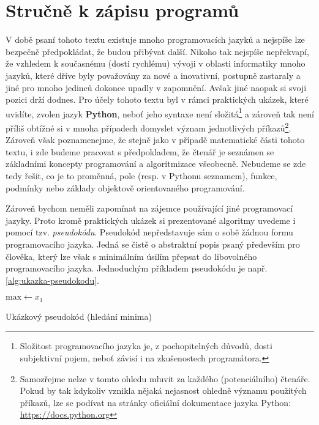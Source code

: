 \section{Stručně k zápisu programů}\label{sec:zapis-programu}

V době psaní tohoto textu existuje mnoho programovacích jazyků a nejspíše lze bezpečně předpokládat, že budou přibývat další. Nikoho tak nejspíše nepřekvapí, že vzhledem k současnému (dosti rychlému) vývoji v oblasti informatiky mnoho jazyků, které dříve byly považovány za nové a inovativní, postupně zastaraly a jiné pro mnoho jedinců dokonce upadly v zapomnění. Avšak jiné naopak si svoji pozici drží dodnes. Pro účely tohoto textu byl v rámci praktických ukázek, které uvidíte, zvolen jazyk \textbf{Python}, neboť jeho syntaxe není složitá\footnote{Složitost programovacího jazyka je, z pochopitelných důvodů, dosti subjektivní pojem, neboť závisí i na zkušenostech programátora.} a zároveň tak není příliš obtížné si v mnoha případech domyslet význam jednotlivých příkazů\footnote{Samozřejme nelze v tomto ohledu mluvit za každého (potenciálního) čtenáře. Pokud by tak kdykoliv vznikla nějaká nejasnost ohledně významu použitých příkazů, lze se podívat na stránky oficiální dokumentace jazyka Python: \url{https://docs.python.org}}. Zároveň však poznamenejme, že stejně jako v případě matematické části tohoto textu, i zde budeme pracovat s předpokladem, že čtenář je seznámen se základními koncepty programování a algoritmizace všeobecně. Nebudeme se zde tedy řešit, co je to proměnná, pole (resp. v Pythonu seznamem), funkce, podmínky nebo základy objektově orientovaného programování.

Zároveň bychom neměli zapomínat na zájemce používající jiné programovací jazyky. Proto kromě praktických ukázek si prezentované algoritmy uvedeme i pomocí tzv. \emph{pseudokódu}. Pseudokód nepředstavuje sám o sobě žádnou formu programovacího jazyka. Jedná se čistě o abstraktní popis psaný především pro člověka, který lze však s minimálním úsilím přepsat do libovolného programovacího jazyka. Jednoduchým příkladem pseudokódu je např. \ref{alg:ukazka-pseudokodu}.
\begin{algorithm}
    $\text{max}\gets x_1$\;
    \caption{Ukázkový pseudokód (hledání minima)}
    \label{alg:ukazka-pseudokodu}
\end{algorithm}

